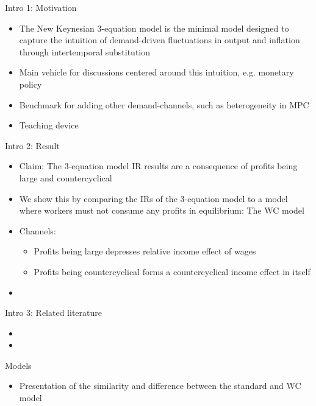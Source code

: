 \documentclass{beamer}
\newcommand{\bit}{\begin{itemize}}
\newcommand{\eit}{\end{itemize}}
\begin{document}
\begin{frame}{Intro 1: Motivation}

\bit
	\item The New Keynesian 3-equation model is the minimal model designed to capture the intuition of demand-driven fluctuations in output and inflation through intertemporal substitution
	\item Main vehicle for discussions centered around this intuition, e.g. monetary policy
	\item Benchmark for adding other demand-channels, such as heterogeneity in MPC
	\item Teaching device
\eit


\end{frame}


\begin{frame}{Intro 2: Result}

\bit
	\item Claim: The 3-equation model IR results are a consequence of profits being large and countercyclical
	\item We show this by comparing the IRs of the 3-equation model to a model where workers must not consume any profits in equilibrium: The WC model
	\item Channels:
		\bit
			\item Profits being large depresses relative income effect of wages
			\item Profits being countercyclical forms a countercyclical income effect in itself
		\eit
	\item 
\eit


\end{frame}

\begin{frame}{Intro 3: Related literature}

\bit
	\item 
	\item 
\eit


\end{frame}

\begin{frame}{Models}

\bit
	\item Presentation of the similarity and difference between the standard and WC model
\eit


\end{frame}
\end{document}
